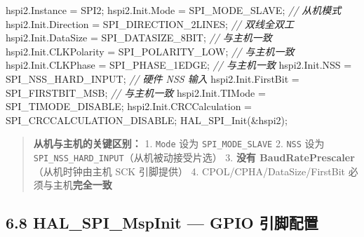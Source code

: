 \documentclass[
  chinese,
  UTF8,
  oneside,
  openany]{ctexbook}
\newenvironment{Shaded}{}{}
\newcommand{\CommentTok}[1]{\textcolor[rgb]{0.38,0.63,0.69}{\textit{#1}}}
\newcommand{\NormalTok}[1]{#1}
\newcommand{\OperatorTok}[1]{\textcolor[rgb]{0.40,0.40,0.40}{#1}}
\begin{document}
\begin{Shaded}
\begin{Highlighting}[]
\NormalTok{hspi2}\OperatorTok{.}\NormalTok{Instance }\OperatorTok{=}\NormalTok{ SPI2}\OperatorTok{;}
\NormalTok{hspi2}\OperatorTok{.}\NormalTok{Init}\OperatorTok{.}\NormalTok{Mode           }\OperatorTok{=}\NormalTok{ SPI\_MODE\_SLAVE}\OperatorTok{;}              \CommentTok{// 从机模式}
\NormalTok{hspi2}\OperatorTok{.}\NormalTok{Init}\OperatorTok{.}\NormalTok{Direction      }\OperatorTok{=}\NormalTok{ SPI\_DIRECTION\_2LINES}\OperatorTok{;}        \CommentTok{// 双线全双工}
\NormalTok{hspi2}\OperatorTok{.}\NormalTok{Init}\OperatorTok{.}\NormalTok{DataSize       }\OperatorTok{=}\NormalTok{ SPI\_DATASIZE\_8BIT}\OperatorTok{;}           \CommentTok{// 与主机一致}
\NormalTok{hspi2}\OperatorTok{.}\NormalTok{Init}\OperatorTok{.}\NormalTok{CLKPolarity    }\OperatorTok{=}\NormalTok{ SPI\_POLARITY\_LOW}\OperatorTok{;}            \CommentTok{// 与主机一致}
\NormalTok{hspi2}\OperatorTok{.}\NormalTok{Init}\OperatorTok{.}\NormalTok{CLKPhase       }\OperatorTok{=}\NormalTok{ SPI\_PHASE\_1EDGE}\OperatorTok{;}             \CommentTok{// 与主机一致}
\NormalTok{hspi2}\OperatorTok{.}\NormalTok{Init}\OperatorTok{.}\NormalTok{NSS            }\OperatorTok{=}\NormalTok{ SPI\_NSS\_HARD\_INPUT}\OperatorTok{;}           \CommentTok{// 硬件 NSS 输入}
\NormalTok{hspi2}\OperatorTok{.}\NormalTok{Init}\OperatorTok{.}\NormalTok{FirstBit       }\OperatorTok{=}\NormalTok{ SPI\_FIRSTBIT\_MSB}\OperatorTok{;}             \CommentTok{// 与主机一致}
\NormalTok{hspi2}\OperatorTok{.}\NormalTok{Init}\OperatorTok{.}\NormalTok{TIMode         }\OperatorTok{=}\NormalTok{ SPI\_TIMODE\_DISABLE}\OperatorTok{;}
\NormalTok{hspi2}\OperatorTok{.}\NormalTok{Init}\OperatorTok{.}\NormalTok{CRCCalculation }\OperatorTok{=}\NormalTok{ SPI\_CRCCALCULATION\_DISABLE}\OperatorTok{;}
\NormalTok{HAL\_SPI\_Init}\OperatorTok{(\&}\NormalTok{hspi2}\OperatorTok{);}
\end{Highlighting}
\end{Shaded}

\begin{quote}
\textbf{从机与主机的关键区别：} 1. \texttt{Mode} 设为
\texttt{SPI\_MODE\_SLAVE} 2. \texttt{NSS} 设为
\texttt{SPI\_NSS\_HARD\_INPUT}（从机被动接受片选） 3. \textbf{没有
BaudRatePrescaler}（从机时钟由主机 SCK 引脚提供） 4.
CPOL/CPHA/DataSize/FirstBit 必须与主机\textbf{完全一致}
\end{quote}

\subsection{6.8 HAL\_SPI\_MspInit --- GPIO
引脚配置}\label{hal_spi_mspinit-gpio-ux5f15ux811aux914dux7f6e}
\end{document}
